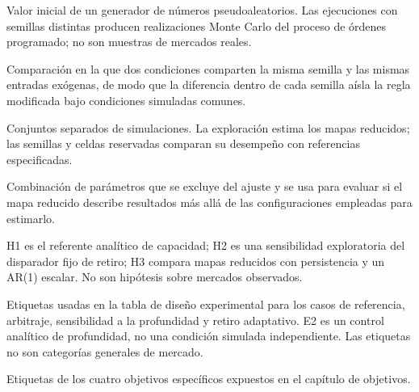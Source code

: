\begin{description}[style=unboxed,leftmargin=0pt,labelwidth=0pt,labelsep=0.5em,itemsep=0.1em]
  \item[Semilla:] Valor inicial de un generador de números pseudoaleatorios. Las ejecuciones con semillas distintas producen realizaciones Monte Carlo del proceso de órdenes programado; no son muestras de mercados reales.
  \item[Diseño pareado:] Comparación en la que dos condiciones comparten la misma semilla y las mismas entradas exógenas, de modo que la diferencia dentro de cada semilla aísla la regla modificada bajo condiciones simuladas comunes.
  \item[Exploración y evaluación reservada:] Conjuntos separados de simulaciones. La exploración estima los mapas reducidos; las semillas y celdas reservadas comparan su desempeño con referencias especificadas.
  \item[Configuración reservada:] Combinación de parámetros que se excluye del ajuste y se usa para evaluar si el mapa reducido describe resultados más allá de las configuraciones empleadas para estimarlo.
  \item[H1--H3:] H1 es el referente analítico de capacidad; H2 es una sensibilidad exploratoria del disparador fijo de retiro; H3 compara mapas reducidos con persistencia y un AR(1) escalar. No son hipótesis sobre mercados observados.
  \item[E0--E3:] Etiquetas usadas en la tabla de diseño experimental para los casos de referencia, arbitraje, sensibilidad a la profundidad y retiro adaptativo. E2 es un control analítico de profundidad, no una condición simulada independiente. Las etiquetas no son categorías generales de mercado.
  \item[OE1--OE4:] Etiquetas de los cuatro objetivos específicos expuestos en el capítulo de objetivos.
\end{description}

